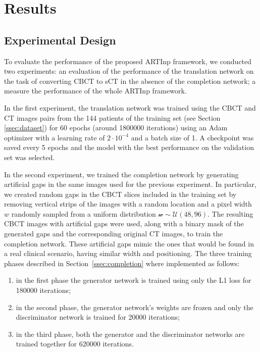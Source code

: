 \section{Results}
\label{sec:results}
\subsection{Experimental Design}
To evaluate the performance of the proposed ARTInp framework, we conducted two experiments: an evaluation of the performance of the translation network on the task of converting CBCT to sCT in the absence of the completion network; a measure the performance of the whole ARTInp framework.

In the first experiment, the translation network was trained using the CBCT and CT images pairs from the 144 patients of the training set (see Section \ref{ssec:dataset}) for 60 epochs (around 1800000 iterations) using an Adam~\cite{Kingma2015} optimizer with a learning rate of $2\cdot10^{-4}$ and a batch size of 1. 
A checkpoint was saved every 5 epochs and the model with the best performance on the validation set was selected. 

In the second experiment, we trained the completion network by generating artificial gaps in the same images used for the previous experiment. 
In particular, we created random gaps in the CBCT slices included in the training set by removing vertical strips of the images with a random location and a pixel width $w$ randomly sampled from a uniform distribution $\mathcal{w}\sim\mathcal{U}(48, 96)$.
The resulting CBCT images with artificial gaps were used, along with a binary mask of the generated gaps and the corresponding original CT images, to train the completion network.
These artificial gaps mimic the ones that would be found in a real clinical scenario, having similar width and positioning. 
The three training phases described in Section~\ref{ssec:completion} where implemented as follows: 
\begin{enumerate}
    \item in the first phase the generator network is trained using only the L1 loss for 180000 iterations;
    \item in the second phase, the generator network's weights are frozen and only the discriminator network is trained for 20000 iterations;
    \item in the third phase, both the generator and the discriminator networks are trained together for 620000 iterations.
\end{enumerate}

